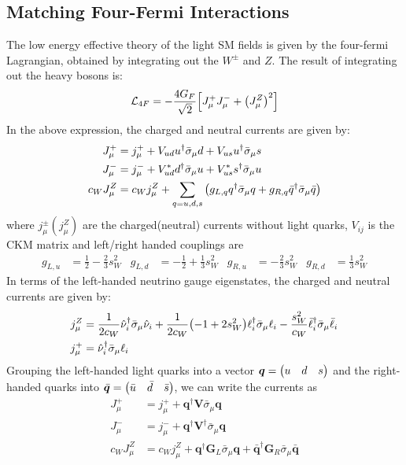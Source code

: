\subsection{Matching Four-Fermi Interactions}
The low energy effective theory of the light SM fields is given by the
four-fermi Lagrangian, obtained by integrating out the \(W^{\pm}\) and
\(Z\). The result of integrating out the heavy bosons is:
\begin{align}
    \mathcal{L}_{4F} = -\frac{4G_{F}}{\sqrt{2}}\qty[J^{+}_{\mu}J^{-}_{\mu} + \qty(J^{Z}_{\mu})^{2}]
\end{align}
In the above expression, the charged and neutral currents are given by:
\begin{align}
    J^{+}_{\mu}      & = j^{+}_{\mu}
    + V_{ud}u^{\dagger}\bar{\sigma}_{\mu}d
    + V_{us}u^{\dagger}\bar{\sigma}_{\mu}s
    \\
    J^{-}_{\mu}      & = j^{-}_{\mu}
    + V^{*}_{ud}d^{\dagger}\bar{\sigma}_{\mu}u
    + V^{*}_{us}s^{\dagger}\bar{\sigma}_{\mu}u
    \\
    c_{W}J^{Z}_{\mu} & = c_{W}j^{Z}_{\mu} +
    \sum_{q=u,d,s}\qty(g_{L,q}q^{\dagger}\bar{\sigma}_{\mu}q
    +g_{R,q}\bar{q}^{\dagger}\bar{\sigma}_{\mu}\bar{q})
\end{align}
where \(j^{\pm}_{\mu}(j^{Z}_{\mu})\) are the charged(neutral) currents without light quarks,
\(V_{ij}\) is the CKM matrix and left/right handed couplings are
\begin{align}
    g_{L,u} & = \frac{1}{2} - \frac{2}{3}s_{W}^{2}  &
    g_{L,d} & = -\frac{1}{2} + \frac{1}{3}s_{W}^{2} &
    g_{R,u} & = -\frac{2}{3}s_{W}^{2}               &
    g_{R,d} & = \frac{1}{3}s_{W}^{2}
\end{align}
In terms of the left-handed neutrino gauge eigenstates, the charged and neutral currents
are given by:
\begin{align}
    j^{Z}_{\mu} & =
    \frac{1}{2c_{W}}\hat{\nu}_{i}^{\dagger}\bar{\sigma}_{\mu}\hat{\nu}_{i}
    +\frac{1}{2c_{W}}\qty(-1+2s_{W}^{2})\ell_{i}^{\dagger}\bar{\sigma}_{\mu}\ell_{i}
    -\frac{s_{W}^{2}}{c_{W}}\bar{\ell}_{i}^{\dagger}\bar{\sigma}_{\mu}\bar{\ell}_{i} \\
    j^{+}_{\mu} & =\hat{\nu}_{i}^{\dagger}\bar{\sigma}_{\mu}\ell_{i}
\end{align}
Grouping the left-handed light quarks into a vector \(\bm{q} = \mqty(u & d & s)\)
and the right-handed quarks into
\(\bar{\bm{q}} = \mqty(\bar{u} & \bar{d} & \bar{s})\), we can write the currents
as
\begin{align}
    J^{+}_{\mu}      & = j^{+}_{\mu}
    +
    \bm{q}^{\dagger}\bm{V}\bar{\sigma}_{\mu}\bm{q}
    \\
    J^{-}_{\mu}      & = j^{-}_{\mu}
    + \bm{q}^{\dagger}\bm{V}^{\dagger}\bar{\sigma}_{\mu}\bm{q}
    \\
    c_{W}J^{Z}_{\mu} & = c_{W}j^{Z}_{\mu} +
    \bm{q}^{\dagger}\bm{G}_{L}\bar{\sigma}_{\mu}\bm{q} +
    \bar{\bm{q}}^{\dagger}\bm{G}_{R}\bar{\sigma}_{\mu}\bar{\bm{q}}
\end{align}
